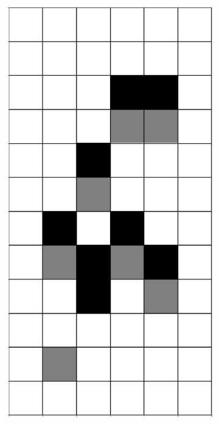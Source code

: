 \documentclass[12pt]{article}
\numberwithin{figure}{section} %
\begin{document}
\begin{figure}[H]
\begin{subfigure}{0.3\textwidth}
     \subcaption{}
   \end{subfigure}
     \begin{subfigure}{0.3\textwidth}
     \centering
     \includegraphics[angle=270,width=\linewidth]{Section4/5.1}
     \subcaption{}
   \end{subfigure}

\end{figure}
\end{document}
